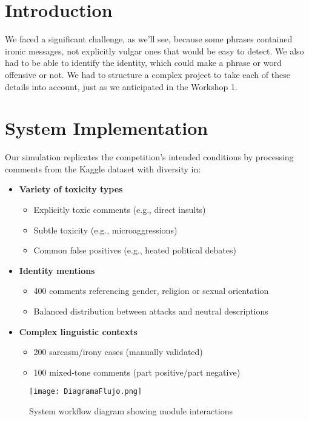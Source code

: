 \documentclass[conference]{IEEEtran}
\begin{document}
\section{Introduction}
We faced a significant challenge, as we'll see, because some phrases contained ironic messages, not explicitly vulgar ones that would be easy to detect. We also had to be able to identify the identity, which could make a phrase or word offensive or not. We had to structure a complex project to take each of these details into account, just as we anticipated in the Workshop 1.

\section{System Implementation}
Our simulation replicates the competition's intended conditions by processing comments from the Kaggle dataset with diversity in:

\begin{itemize}
    \item \textbf{Variety of toxicity types}
    \begin{itemize}
        \item Explicitly toxic comments (e.g., direct insults)
        \item Subtle toxicity (e.g., microaggressions)
        \item Common false positives (e.g., heated political debates)
    \end{itemize}
    
    \item \textbf{Identity mentions}
    \begin{itemize}
        \item 400 comments referencing gender, religion or sexual orientation
        \item Balanced distribution between attacks and neutral descriptions
    \end{itemize}
    
    \item \textbf{Complex linguistic contexts}
    \begin{itemize}
        \item 200 sarcasm/irony cases (manually validated)
        \item 100 mixed-tone comments (part positive/part negative)
    \end{itemize}
\end{itemize}

\begin{figure}[h]
    \centering
    \texttt{[image: DiagramaFlujo.png]}
    \caption{System workflow diagram showing module interactions}
    \label{fig:workflow}
\end{figure}
\end{document}
